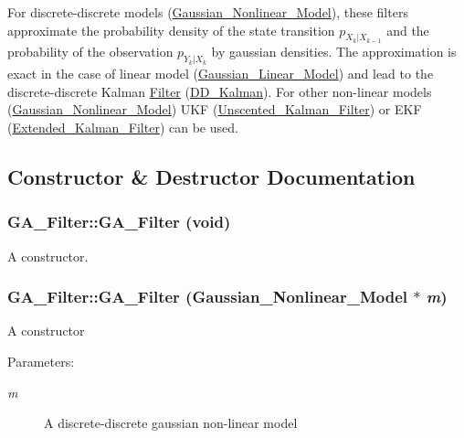 For discrete-discrete models (\hyperlink{class_gaussian___nonlinear___model}{Gaussian\_\-Nonlinear\_\-Model}), these filters approximate the probability density of the state transition $ p_{X_k|X_{k-1}} $ and the probability of the observation $ p_{Y_k|X_k} $ by gaussian densities. The approximation is exact in the case of linear model (\hyperlink{class_gaussian___linear___model}{Gaussian\_\-Linear\_\-Model}) and lead to the discrete-discrete Kalman \hyperlink{class_filter}{Filter} (\hyperlink{class_d_d___kalman}{DD\_\-Kalman}). For other non-linear models (\hyperlink{class_gaussian___nonlinear___model}{Gaussian\_\-Nonlinear\_\-Model}) UKF (\hyperlink{class_unscented___kalman___filter}{Unscented\_\-Kalman\_\-Filter}) or EKF (\hyperlink{class_extended___kalman___filter}{Extended\_\-Kalman\_\-Filter}) can be used. 

\subsection{Constructor \& Destructor Documentation}
\hypertarget{class_g_a___filter_7115851ae209079a5779026aa72aaaee}{
\subsubsection[{GA\_\-Filter}]{\setlength{\rightskip}{0pt plus 5cm}GA\_\-Filter::GA\_\-Filter (void)}}
\label{class_g_a___filter_7115851ae209079a5779026aa72aaaee}


A constructor. 

\hypertarget{class_g_a___filter_07865b9b0bbc296fc1b156d4f0c9d4f4}{
\subsubsection[{GA\_\-Filter}]{\setlength{\rightskip}{0pt plus 5cm}GA\_\-Filter::GA\_\-Filter ({\bf Gaussian\_\-Nonlinear\_\-Model} $\ast$ {\em m})}}
\label{class_g_a___filter_07865b9b0bbc296fc1b156d4f0c9d4f4}


A constructor

\begin{Desc}
\item[Parameters:]
\begin{description}
\item[{\em m}]A discrete-discrete gaussian non-linear model \end{description}
\end{Desc}


